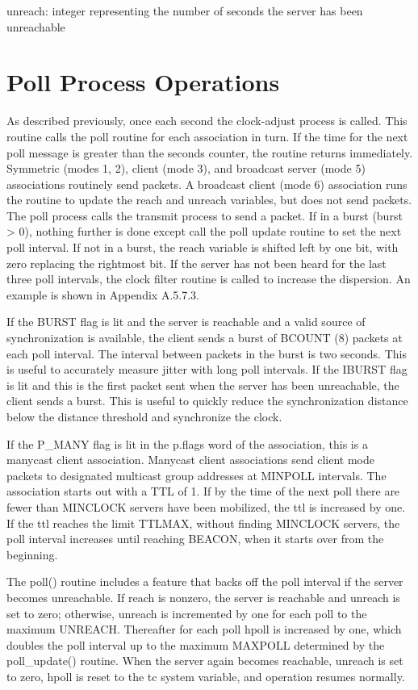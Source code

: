 unreach: integer representing the number of seconds the server has
been unreachable

\section{Poll Process Operations}

As described previously, once each second the clock-adjust process is
called.  This routine calls the poll routine for each association in
turn.  If the time for the next poll message is greater than the
seconds counter, the routine returns immediately.  Symmetric (modes
1, 2), client (mode 3), and broadcast server (mode 5) associations
routinely send packets.  A broadcast client (mode 6) association runs
the routine to update the reach and unreach variables, but does not
send packets.  The poll process calls the transmit process to send a
packet.  If in a burst (burst > 0), nothing further is done except
call the poll update routine to set the next poll interval.
  If not in a burst, the reach variable is shifted left by one bit,
with zero replacing the rightmost bit.  If the server has not been
heard for the last three poll intervals, the clock filter routine is
called to increase the dispersion.  An example is shown in
Appendix A.5.7.3.

If the BURST flag is lit and the server is reachable and a valid
source of synchronization is available, the client sends a burst of
BCOUNT (8) packets at each poll interval.  The interval between
packets in the burst is two seconds.  This is useful to accurately
measure jitter with long poll intervals.  If the IBURST flag is lit
and this is the first packet sent when the server has been
unreachable, the client sends a burst.  This is useful to quickly
reduce the synchronization distance below the distance threshold and
synchronize the clock.

If the P_MANY flag is lit in the p.flags word of the association,
this is a manycast client association.  Manycast client associations
send client mode packets to designated multicast group addresses at
MINPOLL intervals.  The association starts out with a TTL of 1.  If
by the time of the next poll there are fewer than MINCLOCK servers
have been mobilized, the ttl is increased by one.  If the ttl reaches
the limit TTLMAX, without finding MINCLOCK servers, the poll interval
increases until reaching BEACON, when it starts over from the
beginning.

The poll() routine includes a feature that backs off the poll
interval if the server becomes unreachable.  If reach is nonzero, the
server is reachable and unreach is set to zero; otherwise, unreach is
incremented by one for each poll to the maximum UNREACH.  Thereafter
for each poll hpoll is increased by one, which doubles the poll
interval up to the maximum MAXPOLL determined by the poll_update()
routine.  When the server again becomes reachable, unreach is set to
zero, hpoll is reset to the tc system variable, and operation resumes
normally.

